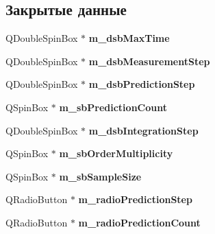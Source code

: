 \subsection*{Закрытые данные}
\begin{DoxyCompactItemize}
\item 
\hypertarget{class_filter_parameters_widget_ae3037e7e6848fc749764de820841b7fb}{}\label{class_filter_parameters_widget_ae3037e7e6848fc749764de820841b7fb} 
Q\+Double\+Spin\+Box $\ast$ {\bfseries m\+\_\+dsb\+Max\+Time}
\item 
\hypertarget{class_filter_parameters_widget_a7d317d8c6f92d6249cbdc67d6b626393}{}\label{class_filter_parameters_widget_a7d317d8c6f92d6249cbdc67d6b626393} 
Q\+Double\+Spin\+Box $\ast$ {\bfseries m\+\_\+dsb\+Measurement\+Step}
\item 
\hypertarget{class_filter_parameters_widget_ab24d59b054e38f00b958beca7d4e96ad}{}\label{class_filter_parameters_widget_ab24d59b054e38f00b958beca7d4e96ad} 
Q\+Double\+Spin\+Box $\ast$ {\bfseries m\+\_\+dsb\+Prediction\+Step}
\item 
\hypertarget{class_filter_parameters_widget_a3cf102cc0aa0e1fd396d2292a1521dd9}{}\label{class_filter_parameters_widget_a3cf102cc0aa0e1fd396d2292a1521dd9} 
Q\+Spin\+Box $\ast$ {\bfseries m\+\_\+sb\+Prediction\+Count}
\item 
\hypertarget{class_filter_parameters_widget_ab4b05c04ba0281a8ead5f20e1b836519}{}\label{class_filter_parameters_widget_ab4b05c04ba0281a8ead5f20e1b836519} 
Q\+Double\+Spin\+Box $\ast$ {\bfseries m\+\_\+dsb\+Integration\+Step}
\item 
\hypertarget{class_filter_parameters_widget_a0e9f6b5eb0b6b0e7674ce233d04adcfd}{}\label{class_filter_parameters_widget_a0e9f6b5eb0b6b0e7674ce233d04adcfd} 
Q\+Spin\+Box $\ast$ {\bfseries m\+\_\+sb\+Order\+Multiplicity}
\item 
\hypertarget{class_filter_parameters_widget_abe75d5ab706fb03c369040b9f59a7f20}{}\label{class_filter_parameters_widget_abe75d5ab706fb03c369040b9f59a7f20} 
Q\+Spin\+Box $\ast$ {\bfseries m\+\_\+sb\+Sample\+Size}
\item 
\hypertarget{class_filter_parameters_widget_a6bd5092ef008cb0cf761b508d37930e9}{}\label{class_filter_parameters_widget_a6bd5092ef008cb0cf761b508d37930e9} 
Q\+Radio\+Button $\ast$ {\bfseries m\+\_\+radio\+Prediction\+Step}
\item 
\hypertarget{class_filter_parameters_widget_a1adc83583bc0c0a3aa5d39aa7643c3bc}{}\label{class_filter_parameters_widget_a1adc83583bc0c0a3aa5d39aa7643c3bc} 
Q\+Radio\+Button $\ast$ {\bfseries m\+\_\+radio\+Prediction\+Count}

\end{DoxyCompactItemize}
